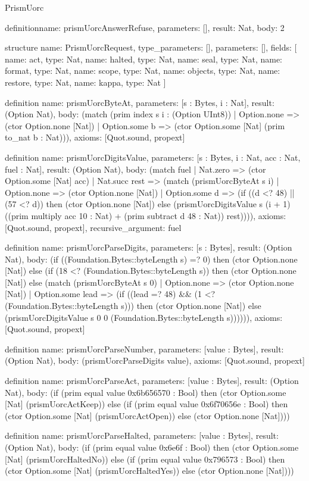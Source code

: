 \begin{lexlean}{PrismUorc}
\begin{semanticmodule}
definition{name: prismUorcAnswerRefuse, parameters: [], result: Nat, body: 2}

structure{
  name: PrismUorcRequest,
  type_parameters: [],
  parameters: [],
  fields: [
    {name: act, type: Nat},
    {name: halted, type: Nat},
    {name: seal, type: Nat},
    {name: format, type: Nat},
    {name: scope, type: Nat},
    {name: objects, type: Nat},
    {name: restore, type: Nat},
    {name: kappa, type: Nat}
  ]
}

definition{
  name: prismUorcByteAt,
  parameters: [s : Bytes, i : Nat],
  result: (Option Nat),
  body: (match (prim index s i : (Option UInt8))
    | Option.none => (ctor Option.none [Nat])
    | Option.some b => (ctor Option.some [Nat] (prim to_nat b : Nat))),
  axioms: [Quot.sound, propext]
}

definition{
  name: prismUorcDigitsValue,
  parameters: [s : Bytes, i : Nat, acc : Nat, fuel : Nat],
  result: (Option Nat),
  body: (match fuel
    | Nat.zero => (ctor Option.some [Nat] acc)
    | Nat.succ rest => (match (prismUorcByteAt s i)
      | Option.none => (ctor Option.none [Nat])
      | Option.some d => (if ((d <? 48) || (57 <? d)) then (ctor Option.none [Nat]) else (prismUorcDigitsValue s (i + 1) ((prim multiply acc 10 : Nat) + (prim subtract d 48 : Nat)) rest)))),
  axioms: [Quot.sound, propext],
  recursive_argument: fuel
}

definition{
  name: prismUorcParseDigits,
  parameters: [s : Bytes],
  result: (Option Nat),
  body: (if ((Foundation.Bytes::byteLength s) =? 0) then (ctor Option.none [Nat]) else (if (18 <? (Foundation.Bytes::byteLength s)) then (ctor Option.none [Nat]) else (match (prismUorcByteAt s 0)
    | Option.none => (ctor Option.none [Nat])
    | Option.some lead => (if ((lead =? 48) && (1 <? (Foundation.Bytes::byteLength s))) then (ctor Option.none [Nat]) else (prismUorcDigitsValue s 0 0 (Foundation.Bytes::byteLength s)))))),
  axioms: [Quot.sound, propext]
}

definition{
  name: prismUorcParseNumber,
  parameters: [value : Bytes],
  result: (Option Nat),
  body: (prismUorcParseDigits value),
  axioms: [Quot.sound, propext]
}

definition{
  name: prismUorcParseAct,
  parameters: [value : Bytes],
  result: (Option Nat),
  body: (if (prim equal value 0x6b656570 : Bool) then (ctor Option.some [Nat] (prismUorcActKeep)) else (if (prim equal value 0x6f70656e : Bool) then (ctor Option.some [Nat] (prismUorcActOpen)) else (ctor Option.none [Nat])))
}

definition{
  name: prismUorcParseHalted,
  parameters: [value : Bytes],
  result: (Option Nat),
  body: (if (prim equal value 0x6e6f : Bool) then (ctor Option.some [Nat] (prismUorcHaltedNo)) else (if (prim equal value 0x796573 : Bool) then (ctor Option.some [Nat] (prismUorcHaltedYes)) else (ctor Option.none [Nat])))
}


\end{semanticmodule}
\end{lexlean}
